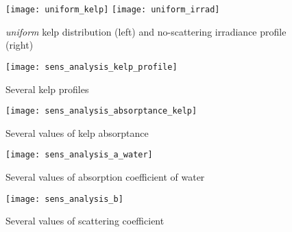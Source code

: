 \begin{figure}[H]
  \centering
  \vspace{-3em}
  \texttt{[image: uniform\_kelp]}
  \texttt{[image: uniform\_irrad]}
  \caption{\textit{uniform} kelp distribution (left) and no-scattering irradiance profile (right)}
\end{figure}

\begin{figure}[H]
  \centering
  \texttt{[image: sens\_analysis\_kelp\_profile]}
  \caption{Several kelp profiles}
\end{figure}

\begin{figure}[H]
  \centering
  \texttt{[image: sens\_analysis\_absorptance\_kelp]}
  \caption{Several values of kelp absorptance}
\end{figure}

\begin{figure}[H]
  \centering
  \texttt{[image: sens\_analysis\_a\_water]}
  \caption{Several values of absorption coefficient of water}
  \label{fig:sens_analysis_a_water}
\end{figure}

\begin{figure}[H]
  \centering
  \texttt{[image: sens\_analysis\_b]}
  \caption{Several values of scattering coefficient}
  \label{fig:sens_analysis_b}
\end{figure}
